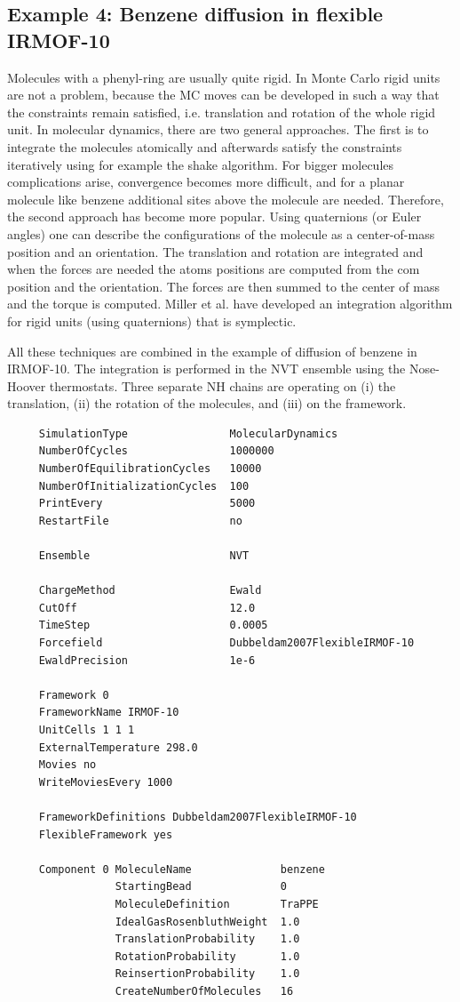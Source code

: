 \subsection*{Example 4: Benzene diffusion in flexible IRMOF-10}

Molecules with a phenyl-ring are usually quite rigid. In Monte Carlo rigid units are not a problem, because the MC moves can be developed in such a way that the
constraints remain satisfied, i.e. translation and rotation of the whole rigid unit. In molecular dynamics, there are two general approaches. The first is to integrate
the molecules atomically and afterwards satisfy the constraints iteratively using for example the shake algorithm. For bigger molecules complications arise, convergence
becomes more difficult, and for a planar molecule like benzene additional sites above the molecule are needed. Therefore, the second approach has become more popular. 
Using quaternions (or Euler angles) one can describe the configurations of the molecule as a center-of-mass position and an orientation. The translation and rotation
are integrated and when the forces are needed the atoms positions are computed from the com position and the orientation. The forces are then summed to the center of mass
and the torque is computed. Miller et al. have developed an integration algorithm for rigid units (using quaternions) that is symplectic.

All these techniques are combined in the example of diffusion of benzene in IRMOF-10. The integration is performed in the NVT ensemble using the Nose-Hoover thermostats.
Three separate NH chains are operating on (i) the translation, (ii) the rotation of the molecules, and (iii) on the framework.

\begin{tiny}
\begin{verbatim}
     SimulationType                MolecularDynamics
     NumberOfCycles                1000000
     NumberOfEquilibrationCycles   10000
     NumberOfInitializationCycles  100
     PrintEvery                    5000
     RestartFile                   no
     
     Ensemble                      NVT
     
     ChargeMethod                  Ewald
     CutOff                        12.0
     TimeStep                      0.0005
     Forcefield                    Dubbeldam2007FlexibleIRMOF-10
     EwaldPrecision                1e-6
     
     Framework 0
     FrameworkName IRMOF-10
     UnitCells 1 1 1
     ExternalTemperature 298.0
     Movies no
     WriteMoviesEvery 1000
     
     FrameworkDefinitions Dubbeldam2007FlexibleIRMOF-10
     FlexibleFramework yes
     
     Component 0 MoleculeName              benzene
                 StartingBead              0
                 MoleculeDefinition        TraPPE
                 IdealGasRosenbluthWeight  1.0
                 TranslationProbability    1.0
                 RotationProbability       1.0
                 ReinsertionProbability    1.0
                 CreateNumberOfMolecules   16
\end{verbatim}
\end{tiny}


